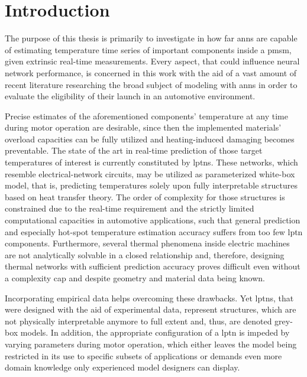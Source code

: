 \chapter{Introduction}
\label{cha:introduction}

The purpose of this thesis is primarily to investigate in how far \glspl{ann} are capable of estimating temperature time series of important components inside a \gls{pmsm}, given extrinsic real-time measurements.
Every aspect, that could influence neural network performance, is concerned in this work with the aid of a vast amount of recent literature researching the broad subject of modeling with \glspl{ann} in order to evaluate the eligibility of their launch in an automotive environment.

Precise estimates of the aforementioned components' temperature at any time during motor operation are desirable, since then the implemented materials' overload capacities can be fully utilized and heating-induced damaging becomes preventable.
The state of the art in real-time prediction of those target temperatures of interest is currently constituted by \glspl{lptn}.
These networks, which resemble electrical-network circuits, may be utilized as parameterized white-box model, that is, predicting temperatures solely upon fully interpretable structures based on heat transfer theory.
The order of complexity for those structures is constrained due to the real-time requirement and the strictly limited computational capacities in automotive applications, such that general prediction and especially hot-spot temperature estimation accuracy suffers from too few \gls{lptn} components.
Furthermore, several thermal phenomena inside electric machines are not analytically solvable in a closed relationship and, therefore, designing thermal networks with sufficient prediction accuracy proves difficult even without a complexity cap and despite geometry and material data being known.

Incorporating empirical data helps overcoming these drawbacks.
Yet \glspl{lptn}, that were designed with the aid of experimental data, represent structures, which are not physically interpretable anymore to full extent and, thus, are denoted grey-box models.
In addition, the appropriate configuration of a \gls{lptn} is impeded by varying parameters during motor operation, which either leaves the model being restricted in its use to specific subsets of applications or demands even more domain knowledge only experienced model designers can display.

